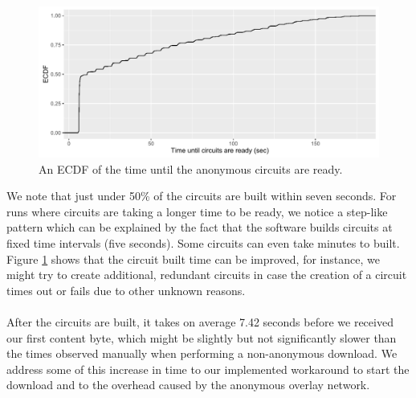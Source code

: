 \begin{figure}[!h]
	\centering
	\includegraphics[width=1.0\columnwidth]{images/big_experiment/circuits_ecdf}
	\caption{An ECDF of the time until the anonymous circuits are ready.}
	\label{fig:big-experiment-circuits}
\end{figure}

\noindent  We note that just under 50\% of the circuits are built within seven seconds. For runs where circuits are taking a longer time to be ready, we notice a step-like pattern which can be explained by the fact that the software builds circuits at fixed time intervals (five seconds). Some circuits can even take minutes to built. Figure \ref{fig:big-experiment-circuits} shows that the circuit built time can be improved, for instance, we might try to create additional, redundant circuits in case the creation of a circuit times out or fails due to other unknown reasons.\\\\
After the circuits are built, it takes on average 7.42 seconds before we received our first content byte, which might be slightly but not significantly slower than the times observed manually when performing a non-anonymous download. We address some of this increase in time to our implemented workaround to start the download and to the overhead caused by the anonymous overlay network.

